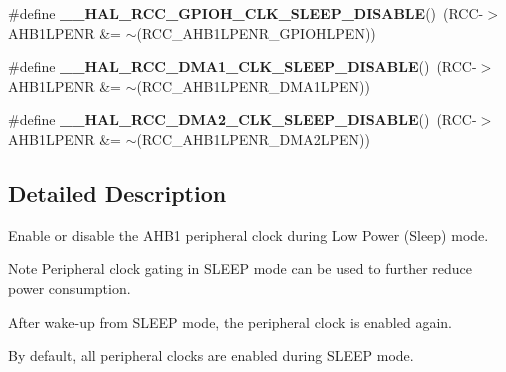\begin{DoxyCompactItemize}
\item 
\#define {\bfseries \+\_\+\+\_\+\+H\+A\+L\+\_\+\+R\+C\+C\+\_\+\+G\+P\+I\+O\+H\+\_\+\+C\+L\+K\+\_\+\+S\+L\+E\+E\+P\+\_\+\+D\+I\+S\+A\+B\+LE}()~(R\+CC-\/$>$A\+H\+B1\+L\+P\+E\+NR \&= $\sim$(R\+C\+C\+\_\+\+A\+H\+B1\+L\+P\+E\+N\+R\+\_\+\+G\+P\+I\+O\+H\+L\+P\+EN))\hypertarget{group___r_c_c___a_h_b1___low_power___enable___disable_ga3150a9552cca2ec7e0f00d799fc52adb}{}\label{group___r_c_c___a_h_b1___low_power___enable___disable_ga3150a9552cca2ec7e0f00d799fc52adb}

\item 
\#define {\bfseries \+\_\+\+\_\+\+H\+A\+L\+\_\+\+R\+C\+C\+\_\+\+D\+M\+A1\+\_\+\+C\+L\+K\+\_\+\+S\+L\+E\+E\+P\+\_\+\+D\+I\+S\+A\+B\+LE}()~(R\+CC-\/$>$A\+H\+B1\+L\+P\+E\+NR \&= $\sim$(R\+C\+C\+\_\+\+A\+H\+B1\+L\+P\+E\+N\+R\+\_\+\+D\+M\+A1\+L\+P\+EN))\hypertarget{group___r_c_c___a_h_b1___low_power___enable___disable_ga8786d21490439ef0564edff087203245}{}\label{group___r_c_c___a_h_b1___low_power___enable___disable_ga8786d21490439ef0564edff087203245}

\item 
\#define {\bfseries \+\_\+\+\_\+\+H\+A\+L\+\_\+\+R\+C\+C\+\_\+\+D\+M\+A2\+\_\+\+C\+L\+K\+\_\+\+S\+L\+E\+E\+P\+\_\+\+D\+I\+S\+A\+B\+LE}()~(R\+CC-\/$>$A\+H\+B1\+L\+P\+E\+NR \&= $\sim$(R\+C\+C\+\_\+\+A\+H\+B1\+L\+P\+E\+N\+R\+\_\+\+D\+M\+A2\+L\+P\+EN))\hypertarget{group___r_c_c___a_h_b1___low_power___enable___disable_ga6af5c50e1a578bcc17c9514c5ab976c9}{}\label{group___r_c_c___a_h_b1___low_power___enable___disable_ga6af5c50e1a578bcc17c9514c5ab976c9}

\end{DoxyCompactItemize}


\subsection{Detailed Description}
Enable or disable the A\+H\+B1 peripheral clock during Low Power (Sleep) mode. 

\begin{DoxyNote}{Note}
Peripheral clock gating in S\+L\+E\+EP mode can be used to further reduce power consumption. 

After wake-\/up from S\+L\+E\+EP mode, the peripheral clock is enabled again. 

By default, all peripheral clocks are enabled during S\+L\+E\+EP mode. 
\end{DoxyNote}
